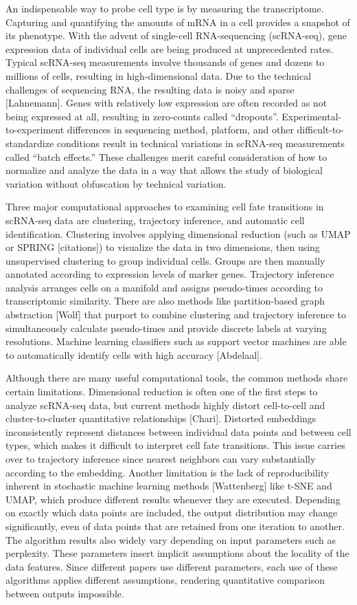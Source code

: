 \documentclass[aps,superscriptaddress, notitlepage,longbibliography]{revtex4-1}
\begin{document}
An indispensable way to probe cell type is by measuring the transcriptome. Capturing and quantifying the amounts of mRNA in a cell provides a snapshot of its phenotype. With the advent of single-cell RNA-sequencing (scRNA-seq), gene expression data of individual cells are being produced at unprecedented rates. Typical scRNA-seq measurements involve thousands of genes and dozens to millions of cells, resulting in high-dimensional data. Due to the technical challenges of sequencing RNA, the resulting data is noisy and sparse [Lahnemann]. Genes with relatively low expression are often recorded as not being expressed at all, resulting in zero-counts called “dropouts”. Experimental-to-experiment differences in sequencing method, platform, and other difficult-to-standardize conditions result in technical variations in scRNA-seq measurements called “batch effects.” These challenges merit careful consideration of how to normalize and analyze the data in a way that allows the study of biological variation without obfuscation by technical variation.

Three major computational approaches to examining cell fate transitions in scRNA-seq data are clustering, trajectory inference, and automatic cell identification. Clustering involves applying dimensional reduction (such as UMAP or SPRING [citations]) to visualize the data in two dimensions, then using unsupervised clustering to group individual cells. Groups are then manually annotated according to expression levels of marker genes. Trajectory inference analysis arranges cells on a manifold and assigns pseudo-times according to transcriptomic similarity. There are also methods like partition-based graph abstraction [Wolf] that purport to combine clustering and trajectory inference to simultaneously calculate pseudo-times and provide discrete labels at varying resolutions. Machine learning classifiers such as support vector machines are able to automatically identify cells with high accuracy [Abdelaal].

Although there are many useful computational tools, the common methods share certain limitations. Dimensional reduction is often one of the first steps to analyze scRNA-seq data, but current methods highly distort cell-to-cell and cluster-to-cluster quantitative relationships [Chari]. Distorted embeddings inconsistently represent distances between individual data points and between cell types, which makes it difficult to interpret cell fate transitions. This issue carries over to trajectory inference since nearest neighbors can vary substantially according to the embedding. Another limitation is the lack of reproducibility inherent in stochastic machine learning methods [Wattenberg] like t-SNE and UMAP, which produce different results whenever they are executed. Depending on exactly which data points are included, the output distribution may change significantly, even of data points that are retained from one iteration to another. The algorithm results also widely vary depending on input parameters such as perplexity. These parameters insert implicit assumptions about the locality of the data features. Since different papers use different parameters, each use of these algorithms applies different assumptions, rendering quantitative comparison between outputs impossible.
\end{document}
